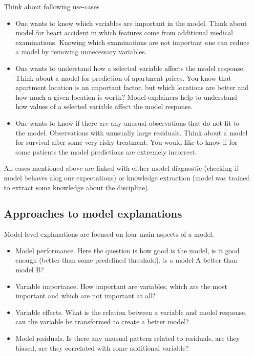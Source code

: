 \documentclass[12pt,]{krantz}
\providecommand{\tightlist}{%
  \setlength{\itemsep}{0pt}\setlength{\parskip}{0pt}}
\theoremstyle{definition}
\theoremstyle{definition}
\theoremstyle{definition}
\theoremstyle{remark}
\begin{document}
Think about following use-cases

\begin{itemize}
\tightlist
\item
  One wants to know which variables are important in the model. Think
  about model for heart accident in which features come from additional
  medical examinations. Knowing which examinations are not important one
  can reduce a model by removing unnecessary variables.
\item
  One wants to understand how a selected variable affects the model
  response. Think about a model for prediction of apartment prices. You
  know that apartment location is an important factor, but which
  locations are better and how much a given location is worth? Model
  explainers help to understand how values of a selected variable affect
  the model response.
\item
  One wants to know if there are any unusual observations that do not
  fit to the model. Observations with unusually large residuals. Think
  about a model for survival after some very risky treatment. You would
  like to know if for some patients the model predictions are extremely
  incorrect.
\end{itemize}

All cases mentioned above are linked with either model diagnostic
(checking if model behaves alog our expectations) or knowledge
extraction (model was trained to extract some knowledge about the
discipline).

\hypertarget{approaches-to-model-explanations}{%
\subsection{Approaches to model
explanations}\label{approaches-to-model-explanations}}

Model level explanations are focused on four main aspects of a model.

\begin{itemize}
\tightlist
\item
  Model performance. Here the question is how good is the model, is it
  good enough (better than some predefined threshold), is a model A
  better than model B?
\item
  Variable importance. How important are variables, which are the most
  important and which are not important at all?
\item
  Variable effects. What is the relation between a variable and model
  response, can the variable be transformed to create a better model?
\item
  Model residuals. Is there any unusual pattern related to residuals,
  are they biased, are they correlated with some additional variable?
\end{itemize}
\end{document}

